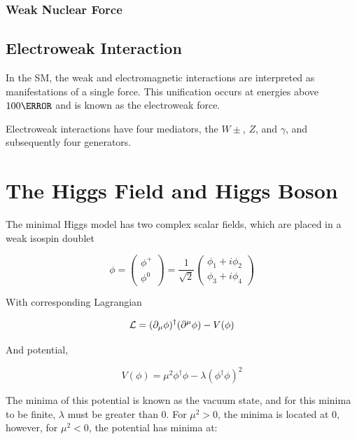         \subsubsection{Weak Nuclear Force}

        \subsection{Electroweak Interaction}

        In the \gls{SM}, the weak and electromagnetic interactions are interpreted as manifestations of a single force. This unification occurs at energies above $\unit{100}{\GeV}$ and is known as the electroweak force.

        Electroweak interactions have four mediators, the $W\pm$, $Z$, and $\gamma$, and subsequently four generators. 


\section{The Higgs Field and Higgs Boson}

The minimal Higgs model has two complex scalar fields, which are placed in a weak isospin doublet

\begin{equation}
\phi = \begin{pmatrix} \phi^+ \\ \phi^0 \end{pmatrix}
    = \frac{1}{\sqrt{2}}\begin{pmatrix}
        \phi_1 + i\phi_2 \\ \phi_3 + i\phi_4
    \end{pmatrix}
\end{equation}

With corresponding Lagrangian

\begin{equation} \label{higgs-lagrangian}
    \mathcal{L} = (\partial_{\mu}\phi)^\dagger (\partial^{\mu}\phi) - V(\phi)\\
\end{equation}

And potential,

\begin{equation} \label{higgs-potential}
    V(\phi) = \mu^2\phi^\dagger \phi - \lambda(\phi^\dagger \phi)^2
\end{equation}

The minima of this potential is known as the vacuum state, and for this minima to be finite, $\lambda$ must be greater than 0. For $\mu^2 >0$, the minima is located at 0, however, for $\mu^2<0$, the potential has minima at:

